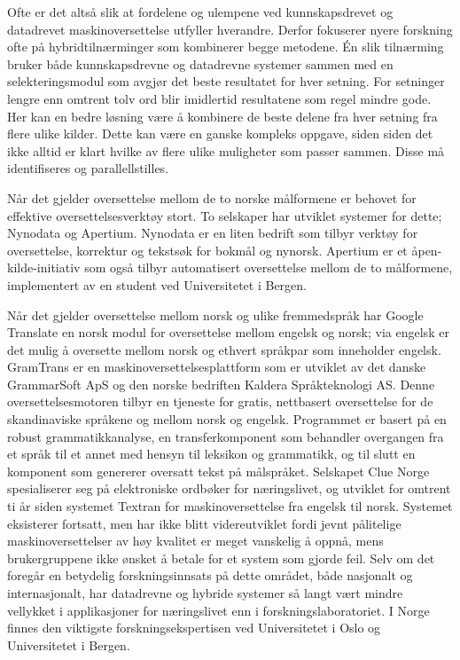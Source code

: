 \begin{multicols}{2}
Ofte er det altså slik at fordelene og ulempene ved kunnskapsdrevet og datadrevet maskinoversettelse utfyller hverandre. Derfor fokuserer nyere forskning ofte på hybridtilnærminger som kombinerer begge metodene. Én slik tilnærming bruker både kunnskapsdrevne og datadrevne systemer sammen med en selekteringsmodul som avgjør det beste resultatet for hver setning. For setninger lengre enn omtrent tolv ord blir imidlertid resultatene som regel mindre gode. Her kan en bedre løsning være å kombinere de beste delene fra hver setning fra flere ulike kilder. Dette kan være en ganske kompleks oppgave, siden siden det ikke alltid er klart hvilke av flere ulike muligheter som passer sammen. Disse må identifiseres og parallellstilles.   


Når det gjelder oversettelse mellom de to norske målformene er behovet for effektive oversettelsesverktøy stort. To selskaper har utviklet systemer for dette; Nynodata og Apertium. Nynodata er en liten bedrift som tilbyr verktøy for oversettelse, korrektur og tekstsøk for bokmål og nynorsk. Apertium er et åpen-kilde-initiativ som også tilbyr automatisert oversettelse mellom de to målformene, implementert av en student ved Universitetet i Bergen.


Når det gjelder oversettelse mellom norsk og ulike fremmedspråk har Google Translate en norsk modul for oversettelse mellom engelsk og norsk; via engelsk er det mulig å oversette mellom norsk og ethvert språkpar som inneholder engelsk. GramTrans er en maskinoversettelsesplattform som er utviklet av det danske GrammarSoft ApS og den norske bedriften Kaldera Språkteknologi AS. Denne oversettelsesmotoren tilbyr en tjeneste for gratis, nettbasert oversettelse for de skandinaviske språkene og mellom norsk og engelsk. Programmet er basert på en robust grammatikkanalyse, en transferkomponent som behandler overgangen fra et språk til et annet med hensyn til leksikon og grammatikk, og til slutt en komponent som genererer oversatt tekst på målspråket. Selskapet Clue Norge spesialiserer seg på elektroniske ordbøker for næringslivet, og utviklet for omtrent ti år siden systemet Textran for maskinoversettelse fra engelsk til norsk. Systemet eksisterer fortsatt, men har ikke blitt videreutviklet fordi jevnt pålitelige maskinoversettelser av høy kvalitet er meget vanskelig å oppnå, mens brukergruppene ikke ønsket å betale for et system som gjorde feil. Selv om det foregår en betydelig forskningsinnsats på dette området, både nasjonalt og internasjonalt, har datadrevne og hybride systemer så langt vært mindre vellykket i applikasjoner for næringslivet enn i forskningslaboratoriet. I Norge finnes den viktigste forskningsekspertisen ved Universitetet i Oslo og Universitetet i Bergen.


\end{multicols}
